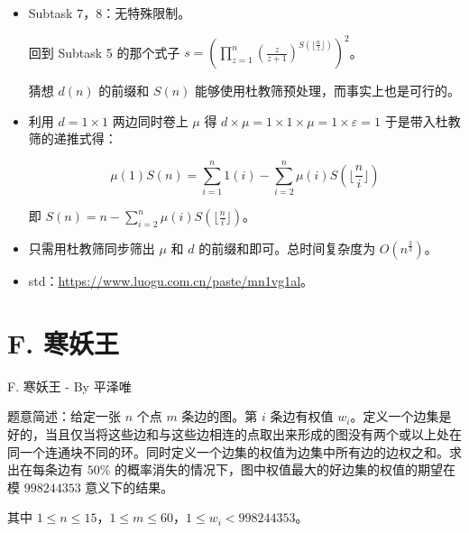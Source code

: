 \documentclass[10pt,aspectratio=43,mathserif]{beamer}
\begin{document}
\begin{frame}

	\begin{itemize} \setlength{\parskip}{0.15\baselineskip}

		\item Subtask 7，8：无特殊限制。

		回到 Subtask 5 的那个式子 $s=(\prod_{z=1}^{n}(\frac z{z+1})^{S(\lfloor\frac nz\rfloor)})^2$。

		猜想 $d(n)$ 的前缀和 $S(n)$ 能够使用杜教筛预处理，而事实上也是可行的。

		\item 利用 $d=1\times 1$ 两边同时卷上 $\mu$ 得 $d\times\mu=1\times1\times\mu=1\times\varepsilon=1$
		于是带入杜教筛的递推式得：
		
		$$\mu(1)S(n)=\sum_{i=1}^n1(i)-\sum_{i=2}^n\mu(i)S(\lfloor\frac ni\rfloor)$$
		
		即 $S(n)=n-\sum_{i=2}^n\mu(i)S(\lfloor\frac ni\rfloor)$。
		
		\item 只需用杜教筛同步筛出 $\mu$ 和 $d$ 的前缀和即可。总时间复杂度为 $O(n^{\frac 23})$。

		\item std：\url{https://www.luogu.com.cn/paste/mn1vg1al}。

	\end{itemize}

\end{frame}


\section{F. 寒妖王}

\begin{frame} \setlength{\parskip}{0.3\baselineskip}

	{\large F. 寒妖王 - By 平泽唯}

	题意简述：给定一张 $n$ 个点 $m$ 条边的图。第 $i$ 条边有权值 $w_i$。定义一个边集是好的，当且仅当将这些边和与这些边相连的点取出来形成的图没有两个或以上处在同一个连通块不同的环。同时定义一个边集的权值为边集中所有边的边权之和。求出在每条边有 $50\%$ 的概率消失的情况下，图中权值最大的好边集的权值的期望在模 $998244353$ 意义下的结果。

	其中 $1\leq n\leq 15$，$1\leq m\leq 60$，$1\leq w_i<998244353$。

\end{frame}
\end{document}
